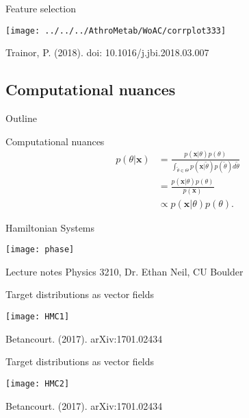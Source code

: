 \documentclass[xcolor=dvipsnames]{beamer}
\begin{document}
\begin{frame}{Feature selection}
\vspace{-10pt}
\begin{center}
\texttt{[image: ../../../AthroMetab/WoAC/corrplot333]}

Trainor, P. (2018). doi: 10.1016/j.jbi.2018.03.007 
\end{center}
\end{frame}

\subsection{Computational nuances}
\begin{frame}{Outline}
\vspace{-10.5pt}
\tableofcontents[currentsection,subsectionstyle=show/shaded/hide]
\end{frame}

\begin{frame}{Computational nuances}
\begin{align*}
p(\theta|\textbf{x})&=\frac{p(\textbf{x}|\theta)p(\theta)}{\int_{\tilde{\theta} \in \Theta} p(\textbf{x}|\tilde{\theta})p(\tilde{\theta})d\tilde{\theta}}\\ &=\frac{p(\textbf{x}|\theta)p(\theta)}{p(\textbf{x})}\\
&\propto p(\textbf{x}|\theta)p(\theta).
\end{align*}
\end{frame}

\begin{frame}{Hamiltonian Systems}
\vspace{-5pt}
\begin{center}
\texttt{[image: phase]}

Lecture notes Physics 3210, Dr. Ethan Neil, CU Boulder
\end{center}
\end{frame}

\begin{frame}{Target distributions as vector fields}
\vspace{-5pt}
\begin{center}
\texttt{[image: HMC1]}

Betancourt. (2017). arXiv:1701.02434
\end{center}
\end{frame}

\begin{frame}{Target distributions as vector fields}
\vspace{-5pt}
\begin{center}
\texttt{[image: HMC2]}

Betancourt. (2017). arXiv:1701.02434
\end{center}
\end{frame}
\end{document}
